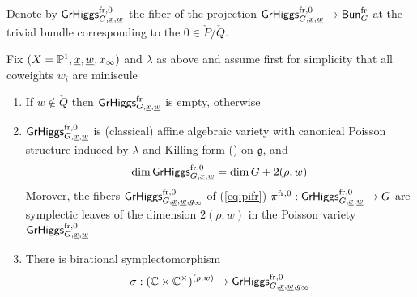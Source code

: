 \documentclass[12pt,psamsfonts,reqno]{amsart}
\begin{document}
Denote by $\mathsf{GrHiggs}^{\mathrm{fr},0}_{G,\underline{x},\underline{w}}$ the fiber
  of the projection $\mathsf{GrHiggs}^{\mathrm{fr},0}_{G,\underline{x},\underline{w}} \to \mathsf{Bun}_{G}^{\mathrm{fr}}$ at the trivial bundle corresponding to the $0 \in \check P / \check Q$. 

\begin{proposition}
  Fix $(X = \mathbb P^1, \underline{x}, \underline{w}, x_\infty)$ and $\lambda$ as above and assume first for simplicity that all coweights $w_i$ are miniscule 
  \begin{enumerate}
  \item If $w \not \in \check Q$ then $ \mathsf{GrHiggs}^{\mathrm{fr}}_{G,\underline{x}, \underline{w}}$ is empty, otherwise
  \item  $ \mathsf{GrHiggs}_{G,\underline{x}, \underline{w}}^{\mathrm{fr},0} $ is (classical) affine algebraic
    variety with canonical Poisson structure induced by $\lambda$ and Killing form () on $\mathfrak{g}$, and
    \begin{equation}
     \dim \mathsf{GrHiggs}_{G,\underline{x}, \underline{w}}^{\mathrm{fr},0}  = \dim G + 2(\rho, w) 
   \end{equation}
   Morover, the fibers $\mathsf{GrHiggs}_{G,\underline{x}, \underline{w}, g_\infty}^{\mathrm{fr},0}$
   of  (\ref{eq:pifr}) $\pi^{\mathrm{fr},0}: \mathsf{GrHiggs}_{G,\underline{x}, \underline{w}}^{\mathrm{fr},0} \to G$ are symplectic leaves of the dimension $2(\rho, w)$ in the Poisson variety $\mathsf{GrHiggs}_{G,\underline{x}, \underline{w}}^{\mathrm{fr},0}$
 \item There is birational symplectomorphism
\begin{equation}
 \label{eq:coord}\sigma:   (\mathbb C \times \mathbb C^{\times} )^{(\rho, w)} \to \mathsf{GrHiggs}_{G,\underline{x}, \underline{w}, g_\infty}^{\mathrm{fr},0} 
\end{equation}


\end{enumerate}
\end{proposition}
\end{document}
